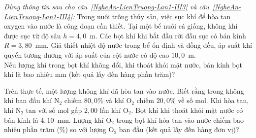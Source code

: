 	\begin{ex}%
		\label{NgheAn-LienTruong-Lan1-III3}\textit{Dùng thông tin sau cho câu~\ref{NgheAn-LienTruong-Lan1-III3} và câu~\ref{NgheAn-LienTruong-Lan1-III4}:} Trong nuôi trồng thủy sản, việc sục khí để hòa tan oxygen vào nước là công đoạn cần thiết. Tại một bể nuôi cá giống, không khí được sục từ độ sâu $h=4{,}0$~m. Các bọt khí khi bắt đầu rời đầu sục có bán kính $R=3{,}80$~mm. Giả thiết nhiệt độ nước trong bể ổn định và đồng đều, áp suất khí quyển tương đương với áp suất của cột nước có độ cao $10{,}0$~m.\\
		Nếu lượng khí trong bọt khí không đổi, khi thoát khỏi mặt nước, bán kính bọt khí là bao nhiêu mm (kết quả lấy đến hàng phần trăm)?
		\par
	\end{ex}

	\begin{ex}%
		\label{NgheAn-LienTruong-Lan1-III4}Trên thực tế, một lượng không khí đã hòa tan vào nước. Biết rằng trong không khí ban đầu khí $\text{N}_2$ chiếm $80{,}0\%$ và khí $\text{O}_2$ chiếm $20{,}0\%$ về số mol. Khi hòa tan, khí $\text{N}_2$ tan với số mol gấp $2{,}00$ lần khí $\text{O}_2$. Bọt khí khi thoát khỏi mặt nước có bán kính là $4{,}10$~mm. Lượng khí $\text{O}_2$ trong bọt khí hòa tan vào nước chiếm bao nhiêu phần trăm (\%) so với lượng $\text{O}_2$ ban đầu (kết quả lấy đến hàng đơn vị)?
		\par
	\end{ex}

